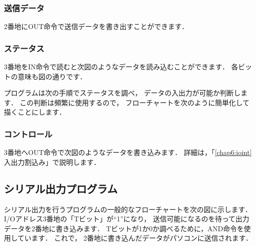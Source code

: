 \subsubsection{送信データ}
2番地にOUT命令で送信データを書き出すことができます．

\subsubsection{ステータス}
3番地をIN命令で読むと次図のようなデータを読み込むことができます．
各ビットの意味も図の通りです．

\begin{center}
\end{center}

プログラムは次の手順でステータスを調べ，
データの入出力が可能か判断します．
この判断は頻繁に使用するので，
フローチャートを次のように簡単化して描くことにします．

\begin{center}
\end{center}

\subsubsection{コントロール}
3番地へOUT命令で次図のようなデータを書き込みます．
詳細は，「\ref{chap6:ioint} 入出力割込み」で説明します．

\begin{center}
\end{center}

\newpage
\subsection{シリアル出力プログラム}
シリアル出力を行うプログラムの一般的なフローチャートを次の図に示します．
I/Oアドレス3番地の「Tビット」が``1''になり，
送信可能になるのを待って出力データを2番地に書き込みます．
Tビットが1か0か調べるために，AND命令を使用しています．
これで，%
2番地に書き込んだデータがパソコンに送信されます．

\begin{center}
\end{center}

